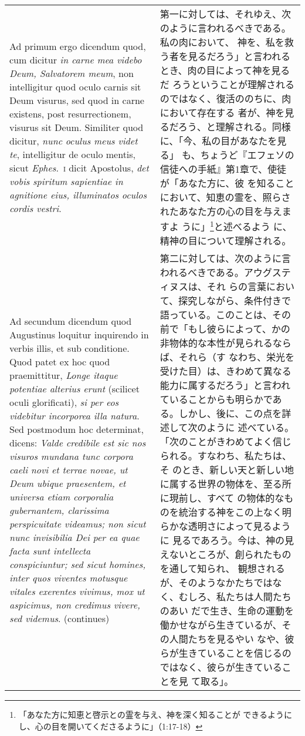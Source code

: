 \documentclass[10pt]{jsarticle} %
\begin{document}
\begin{longtable}{p{21em}p{21em}}
\\


{\sc Ad primum ergo dicendum} quod, cum dicitur {\it in carne mea
videbo Deum, Salvatorem meum}, non intelligitur quod oculo carnis sit
Deum visurus, sed quod in carne existens, post resurrectionem, visurus
sit Deum. Similiter quod dicitur, {\it nunc oculus meus videt te},
intelligitur de oculo mentis, sicut {\it Ephes}.\ {\scshape i} dicit
Apostolus, {\it det vobis spiritum sapientiae in agnitione eius,
illuminatos oculos cordis vestri}.

&

第一に対しては、それゆえ、次のように言われるべきである。私の肉において、
神を、私を救う者を見るだろう」と言われるとき、肉の目によって神を見るだ
ろうということが理解されるのではなく、復活ののちに、肉において存在する
者が、神を見るだろう、と理解される。同様に、「今、私の目があなたを見る」
も、ちょうど『エフェソの信徒への手紙』第1章で、使徒が「あなた方に、彼
を知ることにおいて、知恵の霊を、照らされたあなた方の心の目を与えますよ
うに」\footnote{「あなた方に知恵と啓示との霊を与え、神を深く知ることが
できるようにし、心の目を開いてくださるように」（1:17-18）}と述べるよう
に、精神の目について理解される。



\\


{\sc Ad secundum dicendum} quod Augustinus loquitur inquirendo in
verbis illis, et sub conditione. Quod patet ex hoc quod praemittitur,
{\it Longe itaque potentiae alterius erunt} (scilicet oculi
glorificati), {\it si per eos videbitur incorporea illa natura}. Sed
postmodum hoc determinat, dicens: {\it Valde credibile est sic nos
visuros mundana tunc corpora caeli novi et terrae novae, ut Deum
ubique praesentem, et universa etiam corporalia gubernantem,
clarissima perspicuitate videamus; non sicut nunc invisibilia Dei per
ea quae facta sunt intellecta conspiciuntur; sed sicut homines, inter
quos viventes motusque vitales exerentes vivimus, mox ut aspicimus,
non credimus vivere, sed videmus}. (continues)

&

第二に対しては、次のように言われるべきである。アウグスティヌスは、それ
らの言葉において、探究しながら、条件付きで語っている。このことは、その
前で「もし彼らによって、かの非物体的な本性が見られるならば、それら（す
なわち、栄光を受けた目）は、きわめて異なる能力に属するだろう」と言われ
ていることからも明らかである。しかし、後に、この点を詳述して次のように
述べている。「次のことがきわめてよく信じられる。すなわち、私たちは、そ
のとき、新しい天と新しい地に属する世界の物体を、至る所に現前し、すべて
の物体的なものを統治する神をこの上なく明らかな透明さによって見るように
見るであろう。今は、神の見えないところが、創られたものを通して知られ、
観想されるが、そのようなかたちではなく、むしろ、私たちは人間たちのあい
だで生き、生命の運動を働かせながら生きているが、その人間たちを見るやい
なや、彼らが生きていることを信じるのではなく、彼らが生きていることを見
て取る」。


\end{longtable}
\end{document}
